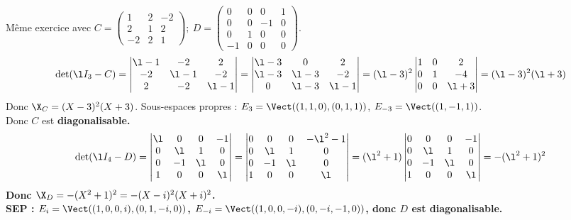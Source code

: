 \documentclass[11pt]{article}
\begin{document}
\begin{ex}{}{}
    Même exercice avec $C=\begin{pmatrix}1&2&-2\\2&1&2\\-2&2&1\end{pmatrix}; ~ D=\begin{pmatrix}0&0&0&1\\0&0&-1&0\\0&1&0&0\\-1&0&0&0\end{pmatrix}$.
    \tcblower
    \begin{equation*}
        \det(\l I_3 - C) = \begin{vmatrix} \l - 1 & -2 & 2 \\ -2&\l-1&-2\\2&-2&\l-1\end{vmatrix}=\begin{vmatrix}\l-3&0&2\\\l-3&\l-3&-2\\0&\l-3&\l-1\end{vmatrix}=(\l-3)^2\begin{vmatrix}1&0&2\\0&1&-4\\0&0&\l+3\end{vmatrix}=(\l-3)^2(\l+3)
    \end{equation*}
    Donc $\X_C = (X-3)^2(X+3)$. Sous-espaces propres : $E_3 =\Vect((1,1,0), (0,1,1))$, $E_{-3}=\Vect((1,-1,1))$.\\
    Donc $C$ est \bf{diagonalisable}.\n
    \begin{equation*}
        \det(\l I_4 - D) = \begin{vmatrix}\l & 0 & 0 & -1\\ 0 & \l & 1 & 0 \\ 0 & -1 & \l & 0 \\ 1 & 0 & 0 & \l\end{vmatrix}=\begin{vmatrix}0&0&0&-\l^2-1\\0&\l&1&0\\0&-1&\l&0\\1&0&0&\l\end{vmatrix} = (\l^2+1)\begin{vmatrix}0&0&0&-1\\0&\l&1&0\\0&-1&\l&0\\1&0&0&\l\end{vmatrix}=-(\l^2+1)^2
    \end{equation*}
    Donc $\X_D=-(X^2+1)^2=-(X-i)^2(X+i)^2$.\\
    SEP : $E_i = \Vect((1,0,0,i), (0,1,-i,0))$, $E_{-i}=\Vect((1,0,0,-i),(0,-i,-1,0))$, donc $D$ est \bf{diagonalisable}.
\end{ex}
\end{document}
